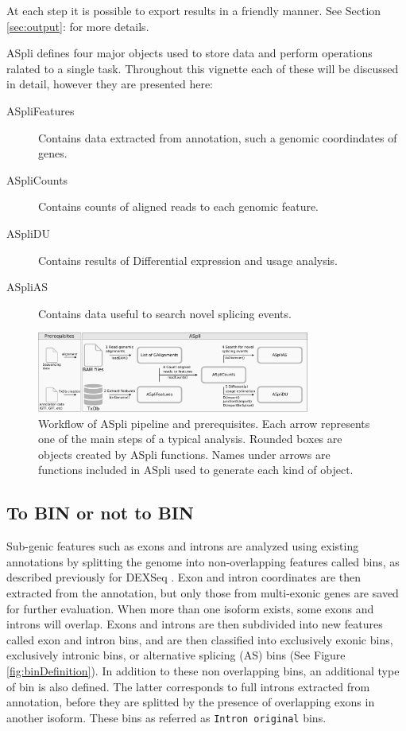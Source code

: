 \documentclass{article}
\begin{document}
At each step it is possible to export results in a friendly manner. 
See Section \ref{sec:output}: for more details.

ASpli defines four major objects used to store data and perform operations
ralated to a single task. Throughout this vignette each of these will be
discussed in detail, however they are presented here:
\begin{description}
  \item[ASpliFeatures] Contains data extracted from annotation, such a genomic
  coordindates of genes.
  \item[ASpliCounts] Contains counts of aligned reads to each genomic feature.
  \item[ASpliDU] Contains results of Differential expression and usage analysis.
  \item[ASpliAS] Contains data useful to search novel splicing events.
\end{description}

\begin{figure}[ht!]
\centering
\includegraphics[width=0.8\textwidth]{images/workflow.pdf}
\caption{ Workflow of ASpli pipeline and prerequisites.  Each arrow represents
one of the main steps of a typical analysis. Rounded boxes are objects created
by ASpli functions.  Names under arrows are functions included in ASpli used to
generate each kind of object. }
\label{fig:ASpliStructure}
\end{figure}

\subsection{To BIN or not to BIN }
\label{sec:binDefinition}
Sub-genic features such as exons and introns are analyzed using existing
annotations by splitting the genome into non-overlapping features called bins, 
as described previously for DEXSeq \cite{pmid22722343}. Exon and intron 
coordinates are then extracted from the annotation, but only those from 
multi-exonic genes are saved for further evaluation. When more than one isoform 
exists, some exons and introns will overlap. Exons and introns are then 
subdivided into new features called exon and intron bins, and are then 
classified into exclusively exonic bins, exclusively intronic bins, or 
alternative splicing (AS) bins (See Figure \ref{fig:binDefinition}). 
In addition to these non overlapping bins, an additional type of bin is also
defined. The latter corresponds to full introns extracted from annotation,
before they are splitted by the presence of overlapping exons in another
isoform. These bins as referred as \texttt{Intron original} bins.
\end{document}
